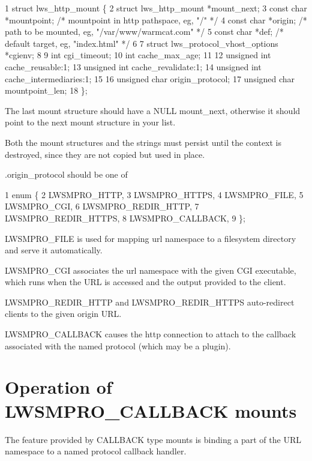 \begin{DoxyCode}
1 struct lws\_http\_mount \{
2         struct lws\_http\_mount *mount\_next;
3         const char *mountpoint; /* mountpoint in http pathspace, eg, "/" */
4         const char *origin; /* path to be mounted, eg, "/var/www/warmcat.com" */
5         const char *def; /* default target, eg, "index.html" */
6 
7         struct lws\_protocol\_vhost\_options *cgienv;
8 
9         int cgi\_timeout;
10         int cache\_max\_age;
11 
12         unsigned int cache\_reusable:1;
13         unsigned int cache\_revalidate:1;
14         unsigned int cache\_intermediaries:1;
15 
16         unsigned char origin\_protocol;
17         unsigned char mountpoint\_len;
18 \};
\end{DoxyCode}


The last mount structure should have a N\+U\+LL mount\+\_\+next, otherwise it should point to the \textquotesingle{}next\textquotesingle{} mount structure in your list.

Both the mount structures and the strings must persist until the context is destroyed, since they are not copied but used in place.

{\ttfamily .origin\+\_\+protocol} should be one of


\begin{DoxyCode}
1 enum \{
2         LWSMPRO\_HTTP,
3         LWSMPRO\_HTTPS,
4         LWSMPRO\_FILE,
5         LWSMPRO\_CGI,
6         LWSMPRO\_REDIR\_HTTP,
7         LWSMPRO\_REDIR\_HTTPS,
8         LWSMPRO\_CALLBACK,
9 \};
\end{DoxyCode}



\begin{DoxyItemize}
\item L\+W\+S\+M\+P\+R\+O\+\_\+\+F\+I\+LE is used for mapping url namespace to a filesystem directory and serve it automatically.
\item L\+W\+S\+M\+P\+R\+O\+\_\+\+C\+GI associates the url namespace with the given C\+GI executable, which runs when the U\+RL is accessed and the output provided to the client.
\item L\+W\+S\+M\+P\+R\+O\+\_\+\+R\+E\+D\+I\+R\+\_\+\+H\+T\+TP and L\+W\+S\+M\+P\+R\+O\+\_\+\+R\+E\+D\+I\+R\+\_\+\+H\+T\+T\+PS auto-\/redirect clients to the given origin U\+RL.
\item L\+W\+S\+M\+P\+R\+O\+\_\+\+C\+A\+L\+L\+B\+A\+CK causes the http connection to attach to the callback associated with the named protocol (which may be a plugin).
\end{DoxyItemize}\hypertarget{md_README.coding_mountcallback}{}\section{Operation of L\+W\+S\+M\+P\+R\+O\+\_\+\+C\+A\+L\+L\+B\+A\+C\+K mounts}\label{md_README.coding_mountcallback}
The feature provided by C\+A\+L\+L\+B\+A\+CK type mounts is binding a part of the U\+RL namespace to a named protocol callback handler.

